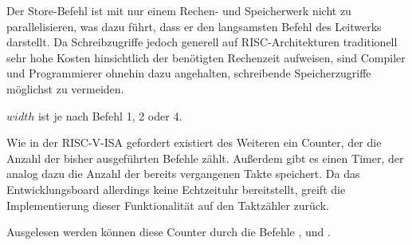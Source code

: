 
Der Store-Befehl ist mit nur einem Rechen- und Speicherwerk nicht zu
parallelisieren, was dazu f\"uhrt, dass er den langsamsten Befehl des
Leitwerks darstellt. Da Schreibzugriffe jedoch generell auf
RISC-Architekturen traditionell sehr hohe Kosten hinsichtlich der
ben\"otigten Rechenzeit aufweisen, sind Compiler und Programmierer
ohnehin dazu angehalten, schreibende Speicherzugriffe m\"oglichst zu
vermeiden.

{\(width\) ist je nach Befehl 1, 2 oder 4.
}

Wie in der RISC-V-ISA gefordert existiert des Weiteren ein Counter, der die
Anzahl der bisher ausgef\"uhrten Befehle z\"ahlt. Au\ss{}erdem gibt es einen
Timer, der analog dazu die Anzahl der bereits vergangenen Takte speichert. Da
das Entwicklungsboard allerdings keine Echtzeituhr bereitstellt, greift die
Implementierung dieser Funktionalit\"at auf den Taktz\"ahler zur\"uck.

Ausgelesen werden k\"onnen diese Counter durch die Befehle
\nolinebreak{},  und .

